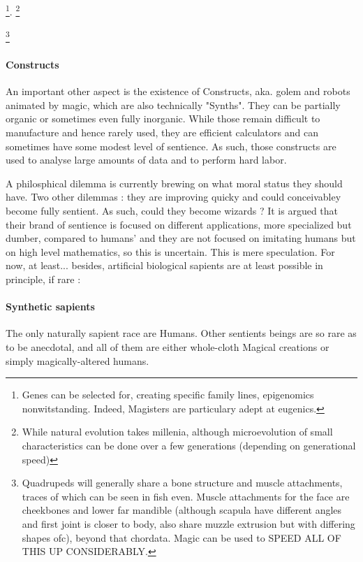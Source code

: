 \footnote{Genes can be selected for, creating specific family lines, epigenomics nonwitstanding. Indeed, Magisters are particulary adept at eugenics.}. \footnote{While natural evolution takes millenia, although microevolution of small characteristics can be done over a few generations (depending on generational speed)}


\footnote{Quadrupeds will generally share a bone structure and muscle attachments, traces of which can be seen in fish even. Muscle attachments for the face are cheekbones and lower far mandible (although scapula have different angles and first joint is closer to body, also share muzzle extrusion but with differing shapes ofc), beyond that chordata. Magic can be used to SPEED ALL OF THIS UP CONSIDERABLY.}


\paragraph{Constructs}


An important other aspect is the existence of Constructs, aka. golem and robots animated by magic, which are also technically "Synths". They can be partially organic or sometimes even fully inorganic. While those remain difficult to manufacture and hence rarely used, they are efficient calculators and can sometimes have some modest level of sentience. As such, those constructs are used to analyse large amounts of data and to perform hard labor. 


A philosphical dilemma is currently brewing on what moral status they should have.
Two other dilemmas : they are improving quicky and could conceivabley become fully sentient. As such, could they become wizards ? It is argued that their brand of sentience is focused on different applications, more specialized but dumber, compared to humans' and they are not focused on imitating humans but on high level mathematics, so this is uncertain. This is mere speculation. For now, at least... besides, artificial biological sapients are at least possible in principle, if rare :








\paragraph{Synthetic sapients}

The only naturally sapient race are Humans. Other sentients beings are so rare as to be anecdotal, and all of them are either whole-cloth Magical creations or simply magically-altered humans. 


